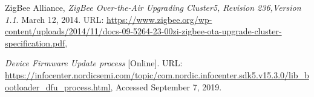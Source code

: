 \begin{thebibliography}{9}
        ZigBee Alliance,
        \textit{ZigBee Over-the-Air Upgrading Cluster5, Revision 236,Version 1.1}.
        March 12, 2014.     
        URL: \url{https://www.zigbee.org/wp-content/uploads/2014/11/docs-09-5264-23-00zi-zigbee-ota-upgrade-cluster-specification.pdf},

        \textit{Device Firmware Update process} [Online].
        URL: \url{https://infocenter.nordicsemi.com/topic/com.nordic.infocenter.sdk5.v15.3.0/lib_bootloader_dfu_process.html},
        Accessed September 7, 2019.
        
\end{thebibliography}